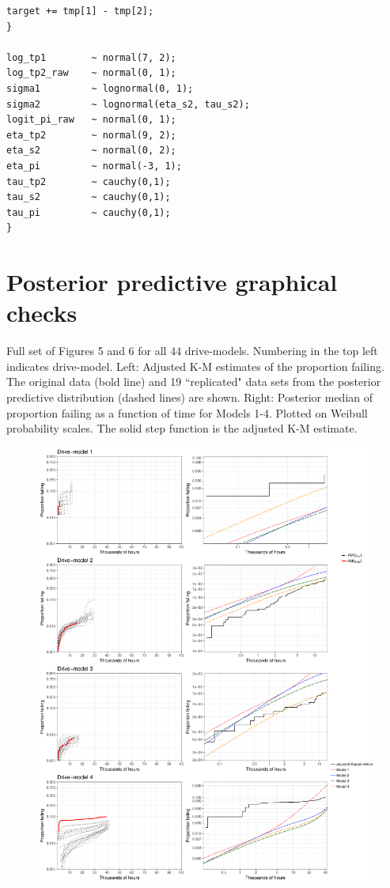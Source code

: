 \documentclass[12pt]{article}
\begin{document}
{\begin{verbatim}
target += tmp[1] - tmp[2];
}

log_tp1        ~ normal(7, 2);
log_tp2_raw    ~ normal(0, 1);
sigma1         ~ lognormal(0, 1);
sigma2         ~ lognormal(eta_s2, tau_s2);
logit_pi_raw   ~ normal(0, 1);
eta_tp2        ~ normal(9, 2);
eta_s2         ~ normal(0, 2);
eta_pi         ~ normal(-3, 1);
tau_tp2        ~ cauchy(0,1);
tau_s2         ~ cauchy(0,1);
tau_pi         ~ cauchy(0,1);
}

\end{verbatim}
}

\pagebreak
\section{Posterior predictive graphical checks}
Full set of Figures 5 and 6 for all 44 drive-models.  Numbering in the top left indicates drive-model.  Left: Adjusted K-M estimates of the proportion failing.  The original data (bold line) and 19 ``replicated" data sets from the posterior predictive distribution (dashed lines) are shown.  Right: Posterior median of proportion failing as a function of time for Models 1-4.  Plotted on Weibull probability scales.  The solid step function is the adjusted K-M estimate.  
\begin{figure}[H]
\includegraphics[width=\textwidth]{ppcheck-v3-1.pdf}
\end{figure}
\end{document}

